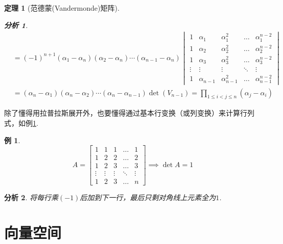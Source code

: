 \documentclass[11pt,UTF8]{ctexart}
\newtheorem{theorem}{定理}
\newtheorem{example}{例}%
\newtheorem*{analysis}{分析}
\begin{document}
\begin{theorem}[范德蒙(Vandermonde)矩阵]
\begin{analysis}
\[\begin{aligned}
&=(-1)^{n+1}(\alpha_1-\alpha_n)(\alpha_2-\alpha_n)\cdots(\alpha_{n-1}-\alpha_n)\begin{vmatrix}1&\alpha _{1}&\alpha _{1}^{2}&\dots &\alpha _{1}^{n-2}\\1&\alpha _{2}&\alpha _{2}^{2}&\dots &\alpha _{2}^{n-2}\\1&\alpha _{3}&\alpha _{3}^{2}&\dots &\alpha _{3}^{n-2}\\\vdots &\vdots &\vdots &\ddots &\vdots \\1&\alpha _{n-1}&\alpha _{n-1}^{2}&\dots &\alpha _{n-1}^{n-2}\end{vmatrix}\\
&=(\alpha_n-\alpha_1)(\alpha_n-\alpha_2)\cdots(\alpha_{n}-\alpha_{n-1})\det(V_{n-1})=\prod_{1\le i<j\le n} (\alpha_j-\alpha_i)
\end{aligned}\]
\end{analysis}
\end{theorem}
\par 除了懂得用拉普拉斯展开外，也要懂得通过基本行变换（或列变换）来计算行列式，如例\ref{fund_row_det}.
\begin{example}
\label{fund_row_det}
\[\displaystyle A={\begin{bmatrix}1&1&1&\dots &1\\1&2&2&\dots &2\\1&2&3&\dots &3\\\vdots &\vdots &\vdots &\ddots &\vdots \\1&2&3&\dots &n\end{bmatrix}}\implies\det A=1\]
\end{example}
\begin{analysis}
将每行乘$(-1)$后加到下一行，最后只剩对角线上元素全为$1$.
\end{analysis}


\section{向量空间}
\end{document}
